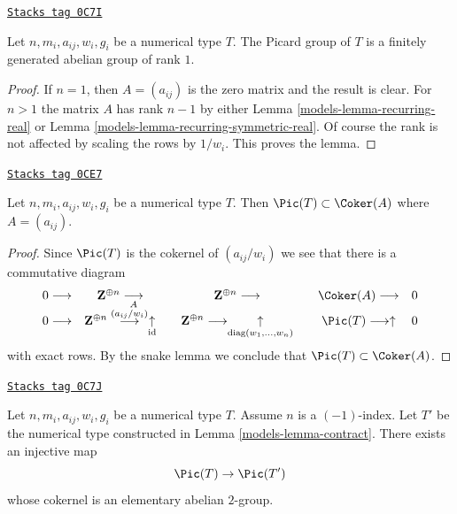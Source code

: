 \begin{lemma}
\label{models-lemma-picard-rank-1}
\href{https://stacks.math.columbia.edu/tag/0C7I}{\texttt{Stacks tag 0C7I}}

Let $n, m_i, a_{ij}, w_i, g_i$ be a numerical type $T$.
The Picard group of $T$ is a finitely generated abelian group of rank $1$.
\end{lemma}

\begin{proof}

If $n = 1$, then $A = (a_{ij})$ is the zero matrix and
the result is clear. For $n > 1$ the matrix $A$ has rank
$n - 1$ by either Lemma \ref{models-lemma-recurring-real} or
Lemma \ref{models-lemma-recurring-symmetric-real}.
Of course the rank is not affected by scaling the rows
by $1/w_i$. This proves the lemma.
\end{proof}

\begin{lemma}
\label{models-lemma-picard-T-and-A}
\href{https://stacks.math.columbia.edu/tag/0CE7}{\texttt{Stacks tag 0CE7}}

Let $n, m_i, a_{ij}, w_i, g_i$ be a numerical type $T$.
Then $\Pic(T) \subset \Coker(A)$ where $A = (a_{ij})$.
\end{lemma}

\begin{proof}
Since $\Pic(T)$ is the cokernel of $(a_{ij}/w_i)$
we see that there is a commutative diagram
$$
\begin{array}{ccccccc}0 \longrightarrow & \mathbf{Z}^{\oplus n} \underset{A}{\longrightarrow} &  & \mathbf{Z}^{\oplus n} \longrightarrow &  & \Coker(A) \longrightarrow & 0 \\ 0 \longrightarrow & \mathbf{Z}^{\oplus n} \overset{(a_{ij}/w_i)}{\longrightarrow}\underset{\text{id}}{\uparrow} &  & \mathbf{Z}^{\oplus n} \longrightarrow\underset{\text{diag}(w_1, \ldots, w_n)}{\uparrow} &  & \Pic(T) \longrightarrow\uparrow & 0\end{array}
$$
with exact rows. By the snake lemma we conclude that
$\Pic(T) \subset \Coker(A)$.
\end{proof}

\begin{lemma}
\label{models-lemma-contract-picard-group}
\href{https://stacks.math.columbia.edu/tag/0C7J}{\texttt{Stacks tag 0C7J}}

Let $n, m_i, a_{ij}, w_i, g_i$ be a numerical type $T$.
Assume $n$ is a $(-1)$-index. Let $T'$ be the numerical
type constructed in Lemma \ref{models-lemma-contract}. There exists an
injective map
$$
\Pic(T) \to \Pic(T')
$$
whose cokernel is an elementary abelian $2$-group.
\end{lemma}

